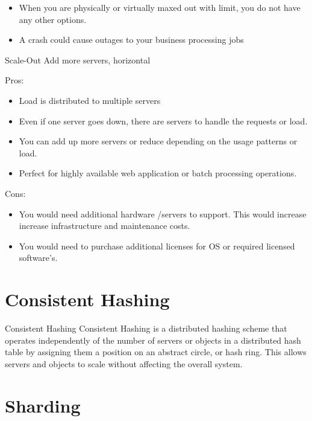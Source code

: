 \documentclass[fancy,11pt,titlestyle=display]{style/elegantbook}
\begin{document}
\begin{itemize}
\item When you are physically or virtually maxed out with limit, you do not have any other options.
\item A crash could cause outages to your business processing jobs

\end{itemize}

\begin{definition}{Scale-Out}{}
Add more servers, horizontal
\end{definition}
Pros:

\begin{itemize}
\item Load is distributed to multiple servers

\item Even if one server goes down, there are servers to handle the requests or load.
\item You can add up more servers or reduce depending on the usage patterns or load.
\item Perfect for highly available web application or batch processing operations.


\end{itemize}

Cons:
\begin{itemize}
\item You would need additional hardware /servers to support. This would increase increase infrastructure and maintenance costs.
\item You would need to purchase additional licenses for OS or required licensed software’s.


\end{itemize}
\section{Consistent Hashing}
\begin{definition}{Consistent Hashing}{}
Consistent Hashing is a distributed hashing scheme that operates independently of the number of servers or objects in a distributed hash table by assigning them a position on an abstract circle, or hash ring. This allows servers and objects to scale without affecting the overall system.
\end{definition}


\section{Sharding}
\end{document}
